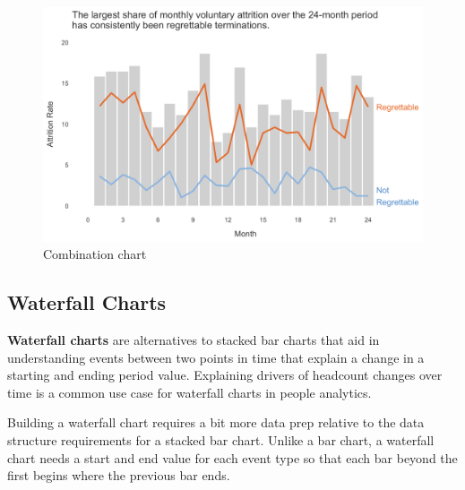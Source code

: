 \documentclass[
]{book}
\begin{document}
\begin{figure}

{\centering \includegraphics[width=1\linewidth]{graphics/combo_chart} 

}

\caption{Combination chart}\label{fig:combo-chart}
\end{figure}

\hypertarget{waterfall-charts}{%
\subsection{Waterfall Charts}\label{waterfall-charts}}

\textbf{Waterfall charts} are alternatives to stacked bar charts that aid in understanding events between two points in time that explain a change in a starting and ending period value. Explaining drivers of headcount changes over time is a common use case for waterfall charts in people analytics.

Building a waterfall chart requires a bit more data prep relative to the data structure requirements for a stacked bar chart. Unlike a bar chart, a waterfall chart needs a start and end value for each event type so that each bar beyond the first begins where the previous bar ends.
\end{document}
